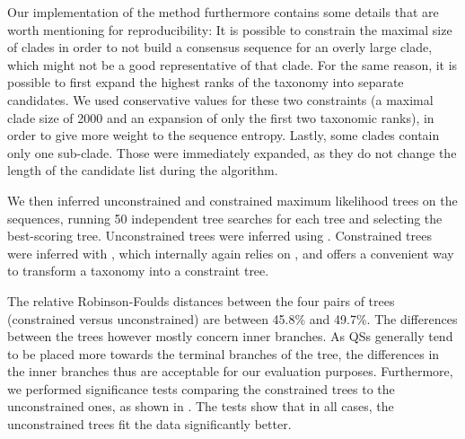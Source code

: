 Our implementation of the method furthermore contains some details that are worth mentioning for reproducibility:
It is possible to constrain the maximal size of clades
in order to not build a consensus sequence for an overly large clade,
which might not be a good representative of that clade.
For the same reason, it is possible to first expand the highest ranks of the taxonomy into separate candidates.
We used conservative values for these two constraints
(a maximal clade size of \num{2 000} and an expansion of only the first two taxonomic ranks),
in order to give more weight to the sequence entropy.
Lastly, some clades contain only one sub-clade.
Those were immediately expanded, as they do not change the length of the candidate list during the algorithm.

We then inferred unconstrained and constrained maximum likelihood trees on the sequences,
running 50 independent tree searches for each tree and selecting the best-scoring tree.
Unconstrained trees were inferred using  \citep{Stamatakis2014}.
Constrained trees were inferred with  \citep{Kozlov2016},
which internally again relies on ,
and offers a convenient way to transform a taxonomy into a constraint tree.

The relative Robinson-Foulds distances \citep{Robinson1981}
between the four pairs of trees (constrained versus unconstrained) are between \num{45.8}\% and \num{49.7}\%.
%
The differences between the trees however mostly concern inner branches.
As \acp{QS} generally tend to be placed more towards the terminal branches of the tree,
the differences in the inner branches thus are acceptable for our evaluation purposes.
Furthermore, we performed significance tests comparing the constrained trees to the unconstrained ones,
as shown in .
The tests show that in all cases, the unconstrained trees fit the data significantly better.

